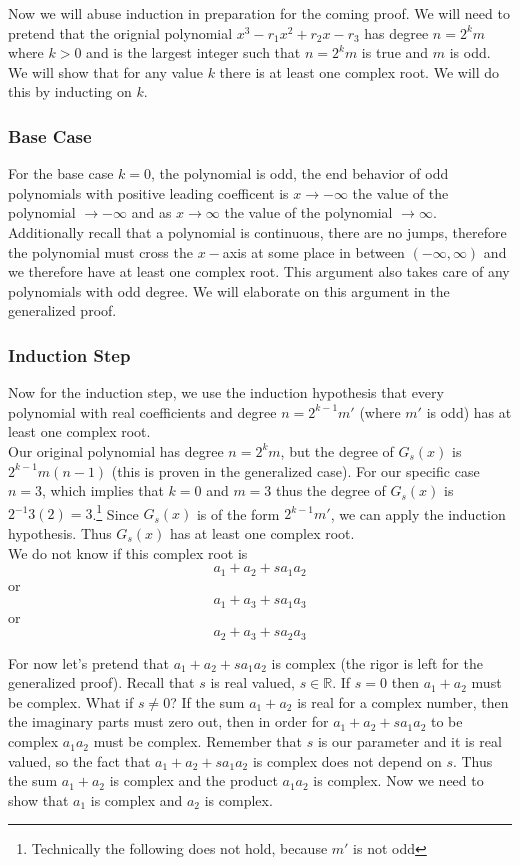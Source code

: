 \documentclass[12pt]{article}
\begin{document}
Now we will abuse induction in preparation for the coming proof.  We will need to pretend that the orignial polynomial $x^3 -r_1 x^2 +r_2 x - r_3$ has  degree $n= 2^k m$ where $k>0$ and is the largest integer such that $n= 2^k m$ is true and $m$ is odd.  We will show that for any value $k$ there is at least one complex root.  We will do this by inducting on $k$.

\subsubsection*{Base Case}
For the base case $k=0$, the polynomial is odd, the end behavior of odd polynomials with positive leading coefficent is $x \rightarrow -\infty$ the value of the polynomial $ \rightarrow -\infty$ and as $x \rightarrow \infty$ the value of the polynomial $ \rightarrow \infty$.  Additionally recall that a polynomial is continuous, there are no jumps, therefore the polynomial must cross the $x-$axis at some place in between $(-\infty, \infty)$ and we therefore have at least one complex root.  This argument also takes care of any polynomials with odd degree.  We will elaborate on this argument in the generalized proof.

\subsubsection*{Induction Step}
Now for the induction step, we use the induction hypothesis that every polynomial with real coefficients and degree $n=2^{k-1} m'$ (where $m'$ is odd) has at least one complex root.\\

Our original polynomial has degree $n=2^k m$, but the degree of $G_s(x)$ is $2^{k-1} m (n-1)$ (this is proven in the generalized case).  For our specific case $n=3$, which implies that $k=0$ and $m=3$ thus the degree of $G_s(x)$ is $2^{-1} 3 (2) = 3$.\footnote{Technically the following does not hold, because $m'$ is not odd}  Since $G_s(x)$ is of the form $2^{k-1} m'$, we can apply the induction hypothesis.  Thus $G_s(x)$ has at least one complex root.\\

We do not know if this complex root is 
$$a_1 + a_2 + s a_1 a_2$$ 
or 
$$a_1 + a_3 + s a_1 a_3$$ 
or 
$$a_2 + a_3 + s a_2 a_3$$  

For now let's pretend that $a_1 + a_2 + s a_1 a_2$ is complex (the rigor is left for the generalized proof).  Recall that $s$ is real valued, $s \in \mathbb{R}$.  If $s=0$ then  $a_1 + a_2$ must be complex.  What if $s \neq 0$?  If the sum $a_1 + a_2$ is real for a complex number, then the imaginary parts must zero out, then in order for $a_1 + a_2 + s a_1 a_2$ to be complex $a_1 a_2$ must be complex.  Remember that $s$ is our parameter and it is real valued, so the fact that $a_1 + a_2 + s a_1 a_2$ is complex does not depend on $s$.  Thus the sum $a_1 + a_2$ is complex and the product $a_1 a_2$ is complex.  Now we need to show that $a_1$ is complex and $a_2$ is complex.\\
\end{document}
